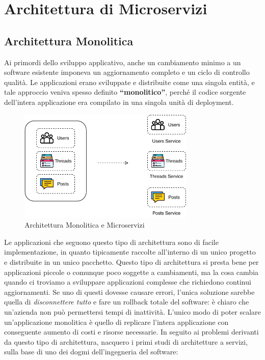 
\section{Architettura di Microservizi}
\subsection{Architettura Monolitica}
Ai primordi dello sviluppo applicativo, anche un cambiamento minimo  a un software esistente imponeva un aggiornamento completo e un ciclo di controllo qualità. Le applicazioni erano sviluppate e distribuite come una singola entità, e tale approccio veniva spesso definito \textbf{“monolitico”}, perché il codice sorgente dell’intera applicazione era compilato in una singola unità di deployment. 

\begin{figure}[H]
    \centering
    \includegraphics[width=0.75\textwidth]{images/01_7_monolithic_vs_microservices.pdf}
    \caption{Architettura Monolitica e Microservizi }
    \label{fig:monolithicvsmicroservices}
\end{figure}

Le applicazioni che seguono questo tipo di architettura sono di facile implementazione, in quanto tipicamente raccolte all'interno di un unico progetto e distribuite in un unico pacchetto. Questo tipo di architettura si presta bene per applicazioni piccole o comunque poco soggette a cambiamenti, ma la cosa cambia quando ci troviamo a sviluppare applicazioni complesse che richiedono continui aggiornamenti. Se uno di questi dovesse causare errori, l'unica soluzione sarebbe quella di \textit{disconnettere tutto} e fare un rollback totale del software: è chiaro che un'azienda non può permettersi tempi di inattività. L’unico modo di poter scalare un’applicazione monolitica è quello di replicare l’intera applicazione con conseguente aumento di costi e risorse necessarie. In seguito ai problemi derivanti da questo tipo di architettura, nacquero i primi studi di architetture a servizi, sulla base di uno dei dogmi dell'ingegneria del software:

